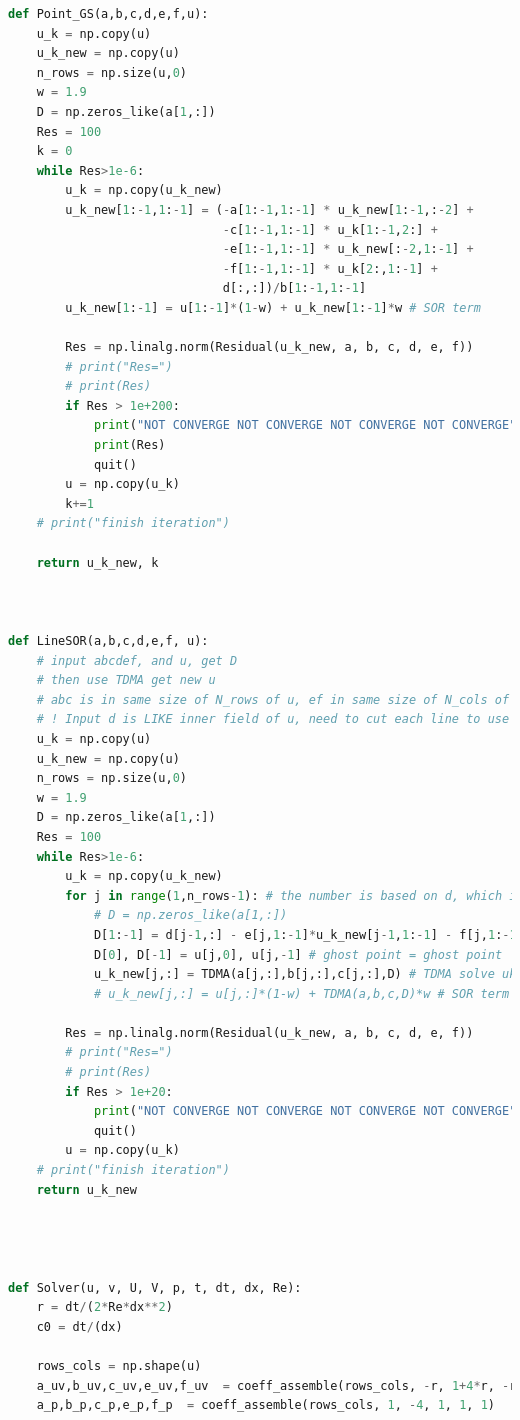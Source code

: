 \documentclass[12pt]{article}
\begin{document}
\begin{scriptsize}
\begin{lstlisting}[language=python,caption={ADI Solver}]
def Point_GS(a,b,c,d,e,f,u):
    u_k = np.copy(u)
    u_k_new = np.copy(u)
    n_rows = np.size(u,0)
    w = 1.9
    D = np.zeros_like(a[1,:])
    Res = 100
    k = 0
    while Res>1e-6:
        u_k = np.copy(u_k_new) 
        u_k_new[1:-1,1:-1] = (-a[1:-1,1:-1] * u_k_new[1:-1,:-2] +
                              -c[1:-1,1:-1] * u_k[1:-1,2:] +
                              -e[1:-1,1:-1] * u_k_new[:-2,1:-1] +
                              -f[1:-1,1:-1] * u_k[2:,1:-1] +
                              d[:,:])/b[1:-1,1:-1]
        u_k_new[1:-1] = u[1:-1]*(1-w) + u_k_new[1:-1]*w # SOR term
        
        Res = np.linalg.norm(Residual(u_k_new, a, b, c, d, e, f))
        # print("Res=")
        # print(Res) 
        if Res > 1e+200: 
            print("NOT CONVERGE NOT CONVERGE NOT CONVERGE NOT CONVERGE") 
            print(Res)
            quit()
        u = np.copy(u_k)
        k+=1
    # print("finish iteration")
        
    return u_k_new, k



def LineSOR(a,b,c,d,e,f, u): 
    # input abcdef, and u, get D
    # then use TDMA get new u
    # abc is in same size of N_rows of u, ef in same size of N_cols of u
    # ! Input d is LIKE inner field of u, need to cut each line to use !
    u_k = np.copy(u)
    u_k_new = np.copy(u)
    n_rows = np.size(u,0)
    w = 1.9
    D = np.zeros_like(a[1,:])
    Res = 100
    while Res>1e-6:
        u_k = np.copy(u_k_new) 
        for j in range(1,n_rows-1): # the number is based on d, which is (N-1)x(N-1)
            # D = np.zeros_like(a[1,:])
            D[1:-1] = d[j-1,:] - e[j,1:-1]*u_k_new[j-1,1:-1] - f[j,1:-1]*u_k[j+1,1:-1]
            D[0], D[-1] = u[j,0], u[j,-1] # ghost point = ghost point
            u_k_new[j,:] = TDMA(a[j,:],b[j,:],c[j,:],D) # TDMA solve uk each line
            # u_k_new[j,:] = u[j,:]*(1-w) + TDMA(a,b,c,D)*w # SOR term
        
        Res = np.linalg.norm(Residual(u_k_new, a, b, c, d, e, f))
        # print("Res=")
        # print(Res) 
        if Res > 1e+20: 
            print("NOT CONVERGE NOT CONVERGE NOT CONVERGE NOT CONVERGE") 
            quit()
        u = np.copy(u_k)
    # print("finish iteration")
    return u_k_new




def Solver(u, v, U, V, p, t, dt, dx, Re):
    r = dt/(2*Re*dx**2)
    c0 = dt/(dx)
    
    rows_cols = np.shape(u)
    a_uv,b_uv,c_uv,e_uv,f_uv  = coeff_assemble(rows_cols, -r, 1+4*r, -r, -r, -r)
    a_p,b_p,c_p,e_p,f_p  = coeff_assemble(rows_cols, 1, -4, 1, 1, 1)


\end{lstlisting}
\end{scriptsize}
\end{document}
